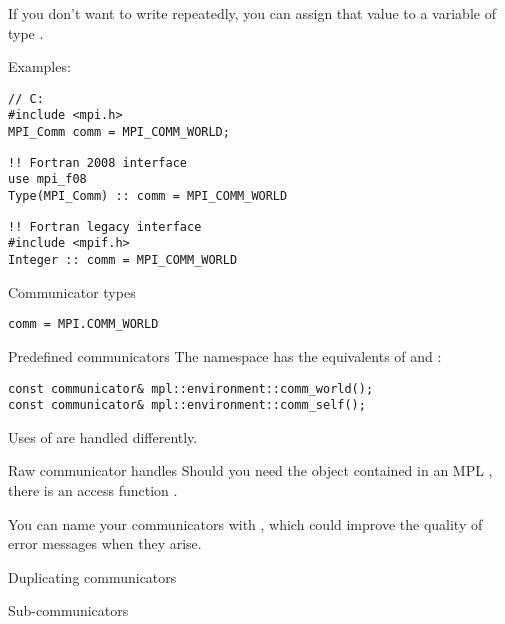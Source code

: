 If you don't want to write  repeatedly, you can
assign that value to a variable of type .

Examples:
\lstset{language=C}
\begin{lstlisting}
// C:
#include <mpi.h>
MPI_Comm comm = MPI_COMM_WORLD;
\end{lstlisting}

\lstset{language=Fortran}
\begin{lstlisting}
!! Fortran 2008 interface
use mpi_f08
Type(MPI_Comm) :: comm = MPI_COMM_WORLD
\end{lstlisting}

\begin{lstlisting}
!! Fortran legacy interface
#include <mpif.h>
Integer :: comm = MPI_COMM_WORLD
\end{lstlisting}
\lstset{language=C}

\begin{pythonnote}{Communicator types}
\lstset{language=python}
\begin{lstlisting}
comm = MPI.COMM_WORLD
\end{lstlisting}
\end{pythonnote}

\begin{mplnote}{Predefined communicators}
  The  namespace has the equivalents
  of  and :
\begin{lstlisting}
const communicator& mpl::environment::comm_world();
const communicator& mpl::environment::comm_self();    
\end{lstlisting}
Uses of  are handled differently.
\end{mplnote}

\begin{mplnote}{Raw communicator handles}
  Should you need the  object
  contained in an MPL ,
  there is an access function .
\end{mplnote}

You can name your communicators with , which
could improve the quality of error messages when they arise.

 {Duplicating communicators}
\label{sec:comm-dup}



 {Sub-communicators}
\label{sec:communicators}

